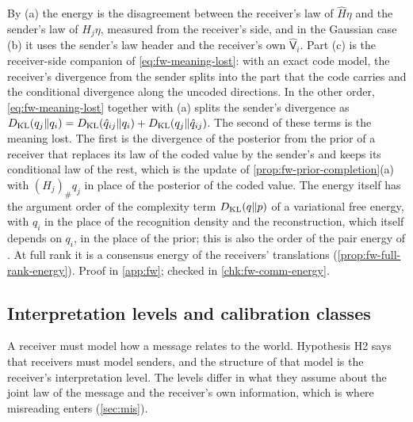 By (a) the energy is the disagreement between the receiver's law of $\hat H\eta$ and the sender's law of $H_j\eta$, measured from the receiver's side, and in the Gaussian case (b) it uses the sender's law header and the receiver's own $\hat{\mathsf V}_i$. Part (c) is the receiver-side companion of \eqref{eq:fw-meaning-lost}: with an exact code model, the receiver's divergence from the sender splits into the part that the code carries and the conditional divergence along the uncoded directions. In the other order, \eqref{eq:fw-meaning-lost} together with (a) splits the sender's divergence as $D_{\mathrm{KL}}(q_j\Vert q_i)=D_{\mathrm{KL}}(\hat q_{ij}\Vert q_i)+D_{\mathrm{KL}}(q_j\Vert\hat q_{ij})$. The second of these terms is the meaning lost. The first is the divergence of the posterior from the prior of a receiver that replaces its law of the coded value by the sender's and keeps its conditional law of the rest, which is the update of \cref{prop:fw-prior-completion}(a) with $(H_j)_\#q_j$ in place of the posterior of the coded value. The energy itself has the argument order of the complexity term $D_{\mathrm{KL}}(q\Vert p)$ of a variational free energy, with $q_i$ in the place of the recognition density and the reconstruction, which itself depends on $q_i$, in the place of the prior; this is also the order of the pair energy of \citet{dennis2026participatory}. At full rank it is a consensus energy of the receivers' translations (\cref{prop:fw-full-rank-energy}). Proof in \cref{app:fw}; checked in \cref{chk:fw-comm-energy}.

\subsection{Interpretation levels and calibration classes}\label{sec:fw-levels}

A receiver must model how a message relates to the world. Hypothesis H2 says that receivers must model senders, and the structure of that model is the receiver's interpretation level. The levels differ in what they assume about the joint law of the message and the receiver's own information, which is where misreading enters (\cref{sec:mis}).

